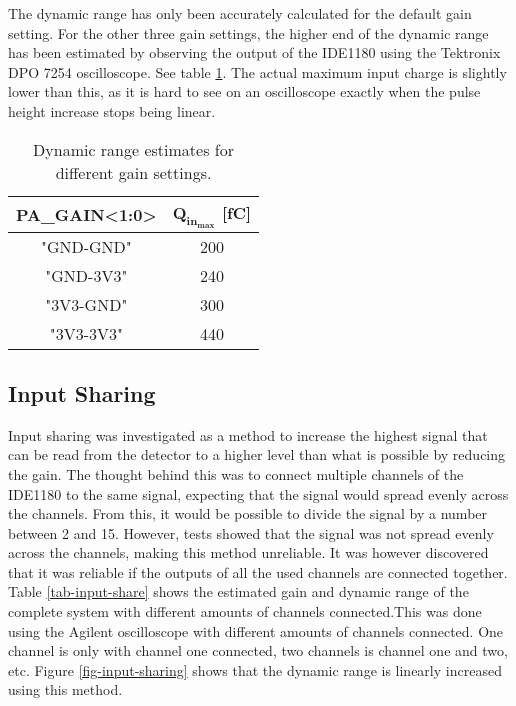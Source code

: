 \documentclass[../main/thesis.tex]{subfiles}
\begin{document}
The dynamic range has only been accurately calculated for the default gain setting. For the other three gain settings, the higher end of the dynamic range has been estimated by observing the output of the IDE1180 using the Tektronix DPO 7254 oscilloscope. See table \ref{tab-dynrange-estimate}. The actual maximum input charge is slightly lower than this, as it is hard to see on an oscilloscope exactly when the pulse height increase stops being linear.
\begin{table}[h!]
	\begin{center}
		\caption{Dynamic range estimates for different gain settings.}
		\label{tab-dynrange-estimate}
		\begin{tabular}{cc}\toprule
			\textbf{PA\_GAIN<1:0>} & \textbf{$\mathbf{Q_{in_{max}}}$ [fC]}   \\ \midrule
		    "GND-GND"     & 200   \\
			"GND-3V3"     & 240       \\
			"3V3-GND"     & 300    \\
			"3V3-3V3"     & 440   \\ \bottomrule
		\end{tabular}
	\end{center}
\end{table}

\subsection{Input Sharing}
\label{ide-inputshare}

Input sharing was investigated as a method to increase the highest signal that can be read from the detector to a higher level than what is possible by reducing the gain. The thought behind this was to connect multiple channels of the IDE1180 to the same signal, expecting that the signal would spread evenly across the channels. From this, it would be possible to divide the signal by a number between 2 and 15. However, tests showed that the signal was not spread evenly across the channels, making this method unreliable. It was however discovered that it was reliable if the outputs of all the used channels are connected together. Table \ref{tab-input-share} shows the estimated gain and dynamic range of the complete system with different amounts of channels connected.This was done using the Agilent oscilloscope with different amounts of channels connected. One channel is only with channel one connected, two channels is channel one and two, etc. Figure \ref{fig-input-sharing} shows that the dynamic range is linearly increased using this method.
\end{document}
